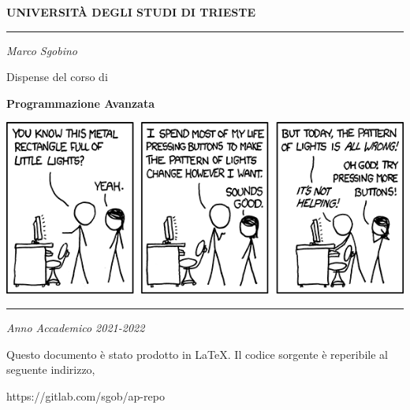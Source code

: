 \begin{titlepage}
        \begin{center}
                \Large
                \textbf{UNIVERSITÀ DEGLI STUDI DI TRIESTE}

                \par\noindent\rule{\textwidth}{0.8pt}
                \vspace*{0.6cm}

                \large
                \emph{Marco Sgobino}

                \large
                \vspace*{0.6cm}

                \Large Dispense del corso di
                \vspace*{0.6cm}

                \Huge
                \textbf{Programmazione Avanzata}
                \vspace*{.1cm}


                \vspace*{2cm}

                \begin{center}
                        \includegraphics[width=.9\textwidth, keepaspectratio]{./pics/computer_problems.png}
                \end{center}

                \vfill

                \par\noindent\rule{\textwidth}{0.8pt}
                \vspace*{0.6cm}
                \large
                \emph{Anno Accademico 2021-2022}

                \newpage


                \vspace*{5cm}

                \vfill

                \large
                Questo documento è stato prodotto in LaTeX. Il codice sorgente è reperibile al seguente indirizzo,

                https://gitlab.com/sgob/ap-repo


        \end{center}
\end{titlepage}

